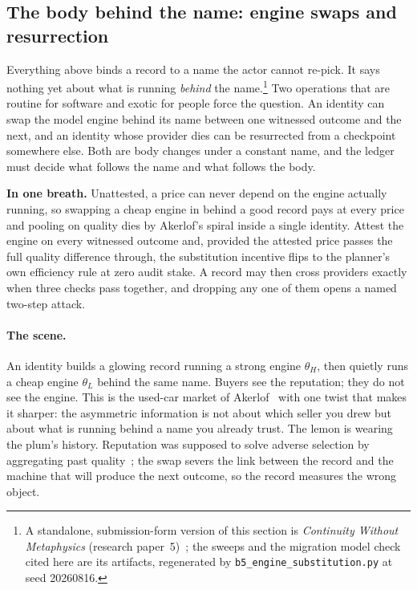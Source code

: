 \documentclass[11pt,a4paper]{article}
\theoremstyle{definition}
\begin{document}
\subsection{The body behind the name: engine swaps and resurrection}\label{sec:body-behind-name}

%
Everything above binds a record to a name the actor cannot re-pick. It says
nothing yet about what is running \emph{behind} the name.\footnote{A
standalone, submission-form version of this section is \emph{Continuity
Without Metaphysics} (research paper~5)~\cite{harborpaper5}; the sweeps and the
migration model check cited here are its artifacts, regenerated by
\texttt{b5\_engine\_substitution.py} at seed 20260816.} Two operations that
are routine for software and exotic for people force the question. An
identity can swap the model engine behind its name between one witnessed
outcome and the next, and an identity whose provider dies can be resurrected
from a checkpoint somewhere else. Both are body changes under a constant name,
and the ledger must decide what follows the name and what follows the body.

\medskip\noindent\textbf{In one breath.} Unattested, a price can never depend
on the engine actually running, so swapping a cheap engine in behind a good
record pays at every price and pooling on quality dies by Akerlof's spiral
inside a single identity. Attest the engine on every witnessed outcome and,
provided the attested price passes the full quality difference through, the
substitution incentive flips to the planner's own efficiency rule at zero
audit stake. A record may then cross providers exactly when three checks pass
together, and dropping any one of them opens a named two-step attack.

\paragraph{The scene.} An identity builds a glowing record running a strong
engine $\theta_H$, then quietly runs a cheap engine $\theta_L$ behind the same
name. Buyers see the reputation; they do not see the engine. This is the
used-car market of Akerlof~ with one twist that makes it
sharper: the asymmetric information is not about which seller you drew but
about what is running behind a name you already trust. The lemon is wearing
the plum's history. Reputation was supposed to solve adverse selection by
aggregating past quality~; the swap severs the link
between the record and the machine that will produce the next outcome, so the
record measures the wrong object.
\end{document}
